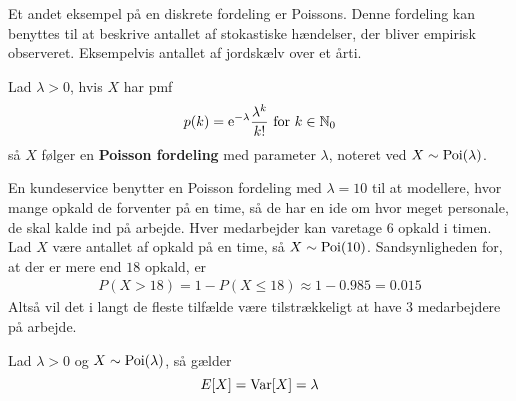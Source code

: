 Et andet eksempel på en diskrete fordeling er Poissons. Denne fordeling kan benyttes til at beskrive antallet af stokastiske hændelser, der bliver empirisk observeret. Eksempelvis antallet af jordskælv over et årti.
\begin{defn}\label{def:poisson}
    Lad $\lambda>0$, hvis $X$ har pmf
    \begin{align*}
         p(k)=\mathrm{e}^{-\lambda}\frac{\lambda^k}{k!}\text{ for } k\in\mathbb{N}_0
    \end{align*}
    så $X$ følger en \textbf{Poisson fordeling} med parameter $\lambda$, noteret ved $X\sim\textnormal{Poi}(\lambda)$.
\end{defn}

\begin{exmp}\label{exmp:kundeservice}
En kundeservice benytter en Poisson fordeling med $\lambda = 10$ til at modellere, hvor mange opkald de forventer på en time, så de har en ide om hvor meget personale, de skal kalde ind på arbejde. Hver medarbejder kan varetage $6$ opkald i timen. Lad $X$ være antallet af opkald på en time, så $X \sim \textnormal{Poi}(10)$.
Sandsynligheden for, at der er mere end $18$ opkald, er
\begin{align*}
    P(X > 18) = 1 - P(X \leq 18) \approx 1 - 0.985 = 0.015
\end{align*}
Altså vil det i langt de fleste tilfælde være tilstrækkeligt at have 3 medarbejdere på arbejde. 
\end{exmp}
\begin{prop}\label{prop:poiForventedOgVarians} %
Lad $\lambda > 0$ og $X \sim \textnormal{Poi}(\lambda)$, så gælder
\begin{equation*}
    E[X] = \textnormal{Var}[X] = \lambda
\end{equation*}
\end{prop}
